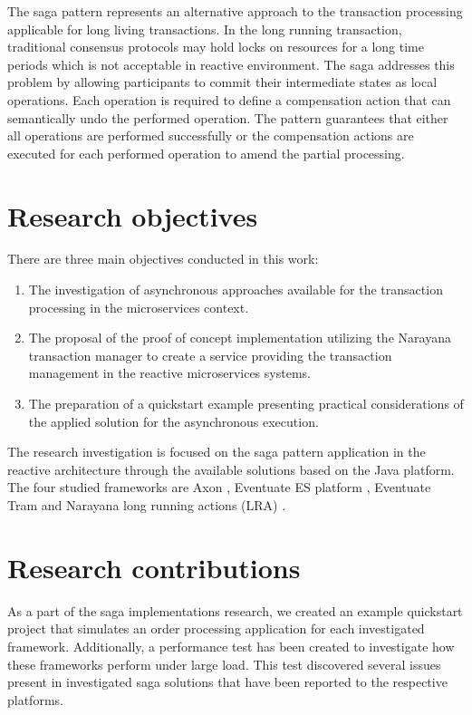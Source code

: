 \documentclass[oneside,
  digital, %
  table,   %
  lof,     %
  lot,     %
]{fithesis3}
\begin{document}
The saga pattern \cite{sagas_publ} represents an alternative approach to the transaction processing applicable for long living transactions. In the long running transaction, traditional consensus protocols may hold locks on resources for a long time periods which is not acceptable in reactive environment. The saga addresses this problem by allowing participants to commit their intermediate states as local operations. Each operation is required to define a compensation action that can semantically undo the performed operation. The pattern guarantees that either all operations are performed successfully or the compensation actions are executed for each performed operation to amend the partial processing.

\section{Research objectives}

There are three main objectives conducted in this work:

\begin{enumerate}
    \item The investigation of asynchronous approaches available for the transaction processing in the microservices context.
    
    \item The proposal of the proof of concept implementation utilizing the Narayana transaction manager \cite{narayana} to create a service providing the transaction management in the reactive microservices systems.
    
    \item The preparation of a quickstart example presenting practical considerations of the applied solution for the asynchronous execution.
\end{enumerate}

The research investigation is focused on the saga pattern \cite{sagas_publ} application in the reactive architecture through the available solutions based on the Java platform. The four studied frameworks are Axon \cite{axon_framework}, Eventuate ES platform \cite{eventuate.io}, Eventuate Tram \cite{eventuate-tram} and Narayana long running actions (LRA) \cite{narayana_lra}. 

\section{Research contributions}

As a part of the saga implementations research, we created an example quickstart project that simulates an order processing application for each investigated framework. Additionally, a performance test has been created to investigate how these frameworks perform under large load. This test discovered several issues present in investigated saga solutions that have been reported to the respective platforms.
\end{document}
